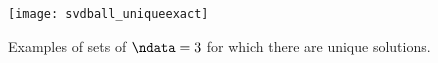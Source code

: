 \documentclass[11pt,titlepage,fleqn]{article}
\begin{document}



\clearpage\pagebreak
\begin{figure}
\centering
\texttt{[image: svdball\_uniqueexact]}
\caption[]
{{
Examples of sets of $\ndata = 3$ for which there are unique solutions.
\label{fig:unique}
}}
\end{figure}

\end{document}
